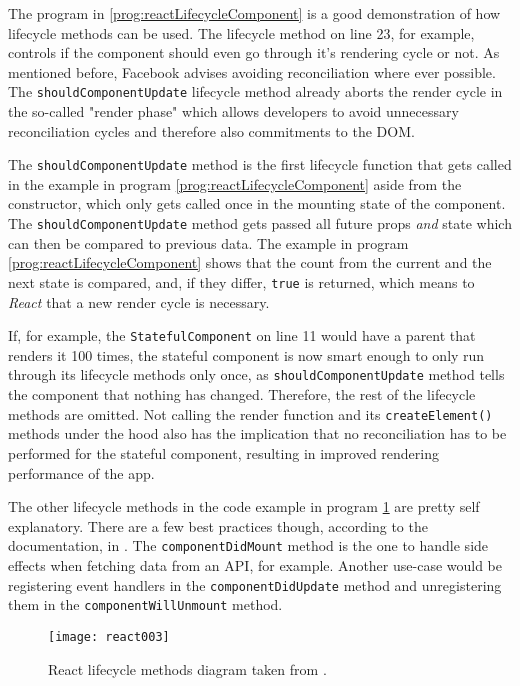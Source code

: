 The program in \ref{prog:reactLifecycleComponent} is a good demonstration of how lifecycle methods can be used. The lifecycle method on line 23, for example, controls if the component should even go through it's rendering cycle or not. As mentioned before, Facebook advises avoiding reconciliation where ever possible. The \texttt{shouldComponentUpdate} lifecycle method already aborts the render cycle in the so-called "render phase" which allows developers to avoid unnecessary reconciliation cycles and therefore also commitments to the DOM. 

The \texttt{shouldComponentUpdate} method is the first lifecycle function that gets called in the example in program \ref{prog:reactLifecycleComponent} aside from the constructor, which only gets called once in the mounting state of the component. The \texttt{shouldComponentUpdate} method gets passed all future props \emph{and} state which can then be compared to previous data. The example in program \ref{prog:reactLifecycleComponent} shows that the count from the current and the next state is compared, and, if they differ, \texttt{true} is returned, which means to \emph{React} that a new render cycle is necessary. 

If, for example, the \texttt{StatefulComponent} on line 11 would have a parent that renders it 100 times, the stateful component is now smart enough to only run through its lifecycle methods only once, as \texttt{shouldComponentUpdate} method tells the component that nothing has changed. Therefore, the rest of the lifecycle methods are omitted. Not calling the render function and its \texttt{createElement()} methods under the hood also has the implication that no reconciliation has to be performed for the stateful component, resulting in improved rendering performance of the app.

The other lifecycle methods in the code example in program \ref{fig:reactLifecycleMethods} are pretty self explanatory. There are a few best practices though, according to the documentation, in \cite{React}. The \texttt{componentDidMount} method is the one to handle side effects when fetching data from an API, for example. Another use-case would be registering event handlers in the \texttt{componentDidUpdate} method and unregistering them in the \texttt{component\-Will\-Unmount} method.

\begin{figure}
  \centering
  \texttt{[image: react003]}
  \caption{React lifecycle methods diagram taken from \cite{ReactRenderCycleDiagram}.}
  \label{fig:reactLifecycleMethods}
\end{figure}

